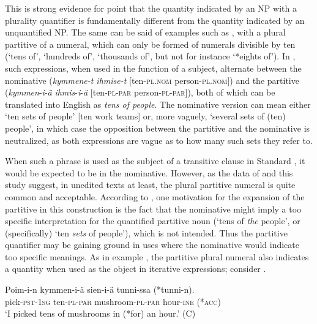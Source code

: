 \documentclass[output=paper]{LSP/langsci}
\begin{document}
This is strong evidence for  point that the quantity indicated by an NP with a plurality quantifier is fundamentally different from the quantity indicated by an unquantified NP. The same can be said of examples such as , with a plural partitive of a numeral, which can only be formed of numerals divisible by ten (‘tens of’, ‘hundreds of’, ‘thousands of’, but not for instance ‘*eights of’). In , such expressions, when used in the function of a subject, alternate between the nominative (\eg \textit{kymmene-t ihmise-t} [ten-\textsc{pl}.\textsc{nom} person-\textsc{pl}.\textsc{nom}]) and the partitive (\eg \textit{kymmen}-\textit{i}-\textit{ä} \textit{ihmis}-\textit{i}-\textit{ä} [ten-\textsc{pl}-\textsc{par} person-\textsc{pl}-\textsc{par}]), both of which can be translated into English as \textit{tens of people}. The nominative version can mean either ‘ten sets of people' [\eg ten work teams] or, more vaguely, ‘several sets of (ten) people’, in which case the opposition between the partitive and the nominative is neutralized, as both expressions are vague as to how many such sets they refer to. 

When such a phrase is used as the subject of a transitive clause in Standard , it would be expected to be in the nominative. However, as the data of \citet{Yli-Vakkuri1979Partitiivisubjektin} and this study suggest, in unedited texts at least, the plural partitive numeral is quite common and acceptable. According to \citet{Yli-Vakkuri1979Partitiivisubjektin}, one motivation for the expansion of the partitive in this construction is the fact that the nominative might imply a too specific interpretation for the quantified partitive noun (\eg ‘tens of \textit{the} people’, or (specifically) ‘ten \textit{sets} of people’), which is not intended. Thus the partitive quantifier may be gaining ground in uses where the nominative would indicate too specific meanings. As in example , the partitive plural numeral also indicates a  quantity when used as the object in iterative expressions; consider . 

\ea%
\label{15-hu-ex:44}

\gll Poim-i-n kymmen-i-ä sien-i-ä tunni-ssa (*tunni-n).\\
pick-\textsc{pst}-\textsc{1sg} ten-\textsc{pl}-\textsc{par} mushroom-\textsc{pl}-\textsc{par} hour-\textsc{ine} (*\textsc{acc})\\
\glt ‘I picked tens of mushrooms in (*for) an hour.’  (C)
\z
\end{document}
